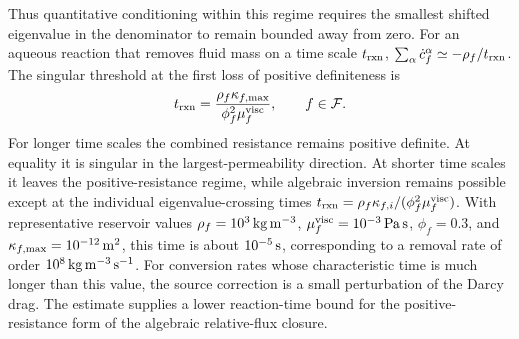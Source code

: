%
Thus quantitative conditioning within this regime requires the smallest
shifted eigenvalue in the denominator to remain bounded away from zero.
For an aqueous reaction that removes fluid mass on a time scale \(t_{\rm rxn}\),
\(\sum_\alpha\dot{c}_f^\alpha\simeq-\rho_f/t_{\rm rxn}\).  The singular threshold
at the first loss of positive definiteness is
%
\begin{equation}
	t_{\rm rxn}
	=
	\frac{\rho_f\kappa_{f,\max}}{\phi_f^2\mu_f^{\mathrm{visc}}},
	\qquad
	f\in\mathcal{F} .
	\label{eq:modified_relative_flux_reaction_timescale_threshold}
\end{equation}
%
For longer time scales the combined resistance remains positive definite.  At
equality it is singular in the largest-permeability direction.  At shorter
time scales it leaves the positive-resistance regime, while algebraic inversion
remains possible except at the individual eigenvalue-crossing times
\(t_{\rm rxn}=\rho_f\kappa_{f,i}/
(\phi_f^2\mu_f^{\mathrm{visc}})\).
With representative reservoir values
\(\rho_f=10^3\,{\rm kg\,m^{-3}}\), \(\mu_f^{\mathrm{visc}}=10^{-3}\,{\rm Pa\,s}\),
\(\phi_f=0.3\), and \(\kappa_{f,\max}=10^{-12}\,{\rm m^2}\), this time is about
\(10^{-5}\,{\rm s}\), corresponding to a removal rate of order
\(10^8\,{\rm kg\,m^{-3}\,s^{-1}}\).  For conversion rates whose characteristic
time is much longer than this value, the source correction is a small
perturbation of the Darcy drag.  The estimate supplies a lower reaction-time
bound for the positive-resistance form of the algebraic relative-flux closure.

